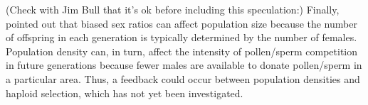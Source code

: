 \documentclass[12pt]{article}
\begin{document}
{\color{blue}
(Check with Jim Bull that it's ok before including this speculation:)
Finally, \citet{Hamilton:1967ts} pointed out that biased sex ratios can affect population size because the number of offspring in each generation is typically determined by the number of females. 
Population density can, in turn, affect the intensity of pollen/sperm competition in future generations because fewer males are available to donate pollen/sperm in a particular area. 
Thus, a feedback could occur between population densities and haploid selection, which has not yet been investigated. 
}






\end{document}
